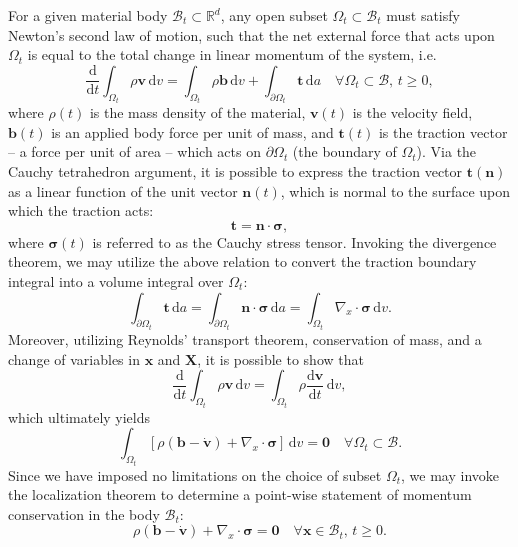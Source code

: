 For a given material body $\mathcal{B}_t \subset \mathbb{R}^d$, any open subset $\Omega_t \subset \mathcal{B}_t$ must satisfy Newton's second law of motion, such that the net external force that acts upon $\Omega_t$ is equal to the total change in linear momentum of the system, i.e.
\begin{equation}
  \frac{\mathrm d}{\mathrm dt} \int_{\Omega_t} \rho \bm{v} \, \mathrm dv = \int_{\Omega_t} \rho \bm{b} \, \mathrm dv + \int_{\partial \Omega_t} \bm{t} \, \mathrm da \quad \forall \Omega_t \subset \mathcal{B}, \, t \geq 0,
\end{equation}
where $\rho(t)$ is the mass density of the material, $\bm{v}(t)$ is the velocity field, $\bm{b}(t)$ is an applied body force per unit of mass, and $\bm{t}(t)$ is the traction vector -- a force per unit of area -- which acts on $\partial \Omega_t$ (the boundary of $\Omega_t$). Via the Cauchy tetrahedron argument, it is possible to express the traction vector $\bm{t} (\bm{n})$ as a linear function of the unit vector $\bm{n}(t)$, which is normal to the surface upon which the traction acts:
\begin{equation}
  \bm{t} = \bm{n} \cdot \boldsymbol{\sigma},
\end{equation}
where $\boldsymbol{\sigma}(t)$ is referred to as the Cauchy stress tensor. Invoking the divergence theorem, we may utilize the above relation to convert the traction boundary integral into a volume integral over $\Omega_t$:
\begin{equation}
  \int_{\partial \Omega_t} \bm{t} \, \mathrm da = \int_{\partial \Omega_t} \bm{n} \cdot \boldsymbol{\sigma} \, \mathrm da = \int_{\Omega_t} \nabla_x \cdot \boldsymbol{\sigma} \, \mathrm dv.
\end{equation}
Moreover, utilizing Reynolds' transport theorem, conservation of mass, and a change of variables in $\bm{x}$ and $\bm{X}$, it is possible to show that
\begin{equation}
  \frac{\mathrm d}{\mathrm dt} \int_{\Omega_t} \rho \bm{v} \, \mathrm dv = \int_{\Omega_t} \rho \frac{\mathrm d \bm{v}}{\mathrm dt} \, \mathrm dv,
\end{equation}
which ultimately yields
\begin{equation}
  \int_{\Omega_t} \left[ \rho (\bm{b} - \dot{\bm{v}}) + \nabla_x \cdot \boldsymbol{\sigma} \right] \, \mathrm dv = \bm{0} \quad \forall \Omega_t \subset \mathcal{B}.
\end{equation}
Since we have imposed no limitations on the choice of subset $\Omega_t$, we may invoke the localization theorem to determine a point-wise statement of momentum conservation in the body $\mathcal{B}_t$:
\begin{equation}
  \rho (\bm{b} - \dot{\bm{v}}) + \nabla_x \cdot \boldsymbol{\sigma} = \bm{0} \quad \forall \bm{x} \in \mathcal{B}_t, \, t \geq 0.
\end{equation}

